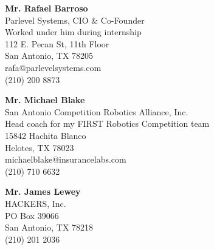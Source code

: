 \textbf{Mr. Rafael Barroso} \\
Parlevel Systems, CIO \& Co-Founder \\
Worked under him during internship \\
112 E. Pecan St, 11th Floor \\
San Antonio, TX 78205 \\
rafa@parlevelsystems.com \\
(210) 200 8873

\vspace{40pt}
\textbf{Mr. Michael Blake} \\
San Antonio Competition Robotics Alliance, Inc. \\
Head coach for my FIRST Robotics Competition team \\
15842 Hachita Blanco \\
Helotes, TX 78023 \\
michaelblake@insurancelabs.com \\
(210) 710 6632

\vspace{40pt}
\textbf{Mr. James Lewey} \\
HACKERS, Inc. \\
PO Box 39066 \\
San Antonio, TX 78218 \\
(210) 201 2036

